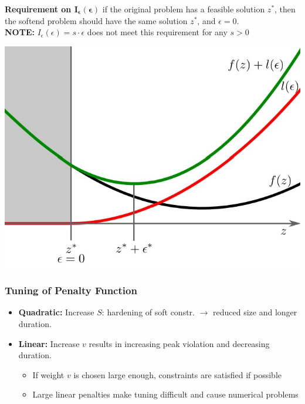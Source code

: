 \begin{minipage}[]{0.49\linewidth}
\textbf{Requirement on $\mathbf{I_\epsilon(\epsilon)}$}
if the original problem has a feasible solution $z^*$, then the softend problem should have the same solution $z^*$, and $\epsilon = 0$.\\
\textbf{NOTE:} $I_\epsilon(\epsilon) = s \cdot \epsilon$ does not meet this requirement for any $s > 0$ \\
\end{minipage}
\begin{minipage}[]{0.49\linewidth}
\begin{center}
\includegraphics[width= 0.8\linewidth]{MPC_summary/Images/Quadratic_penalty.jpg}
\end{center}
\end{minipage}
\subsubsection{Tuning of Penalty Function}
\begin{itemize}
    \item \textbf{Quadratic:} Increase $S$: hardening of soft constr. $\rightarrow$ reduced size and longer duration.
    \item \textbf{Linear: }Increase $v$ results in increasing peak violation and decreasing duration.
    \begin{itemize}
        \item If weight $v$ is chosen large enough, constraints are satisfied if possible
        \item Large linear penalties make tuning difficult and cause numerical problems
    \end{itemize}
\end{itemize}
